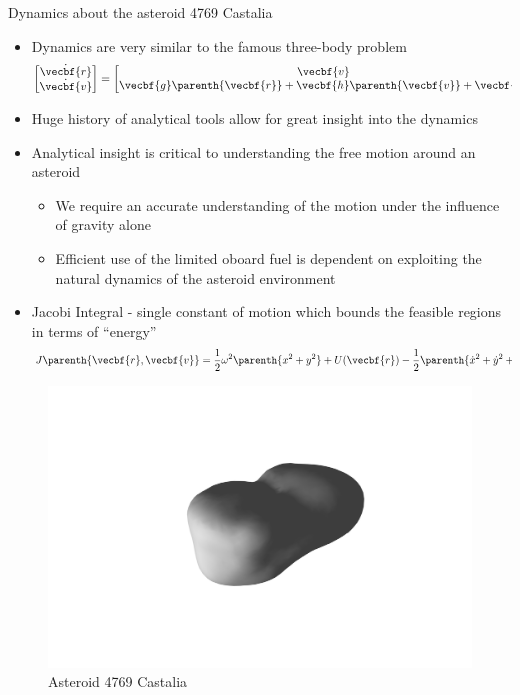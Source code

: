 \documentclass[final, usenames, dvipsnames]{beamer}
\newlength{\twocolwidth}
\begin{document}
\begin{frame}[t]
\begin{columns}[T,onlytextwidth]
\begin{column}{\twocolwidth}
\begin{block}{Dynamics about the asteroid 4769 Castalia} %
	\begin{minipage}{0.5\columnwidth} %
	\begin{itemize}
		\item Dynamics are very similar to the famous three-body problem
			\[
			\begin{bmatrix} \dot{\vecbf{r}} \\ \dot{\vecbf{v}} \end{bmatrix} =
			\begin{bmatrix}\vecbf{v} \\ \vecbf{g} \parenth{\vecbf{r}} + \vecbf{h}\parenth{\vecbf{v}} + \vecbf{u} \end{bmatrix} 
			\]
		\item Huge history of analytical tools allow for great insight into the dynamics
		\item Analytical insight is critical to understanding the free motion around an asteroid
		\begin{itemize}
			\item We require an accurate understanding of the motion under the influence of gravity alone
			\item Efficient use of the limited oboard fuel is dependent on exploiting the natural dynamics of the asteroid environment
		\end{itemize}
		\item Jacobi Integral - single constant of motion which bounds the feasible regions in terms of ``energy''
			\[
			J \parenth{\vecbf{r}, \vecbf{v}} = \frac{1}{2} \omega^2 \parenth{x^2 + y^2} + U(\vecbf{r}) - \frac{1}{2} \parenth{\dot{x}^2 + \dot{y}^2 + \dot{z}^2} 
			\]
	\end{itemize}
	\end{minipage}%
	\begin{minipage}{0.5\columnwidth}%
		\begin{figure}
			\includegraphics[trim={8cm 3cm 7cm 3cm},clip,width=\columnwidth]{figures/castalia.pdf}
			\caption*{Asteroid 4769 Castalia}
		\end{figure}
	\end{minipage}%


\end{block}
\end{column}
\end{columns}
\end{frame}
\end{document}
